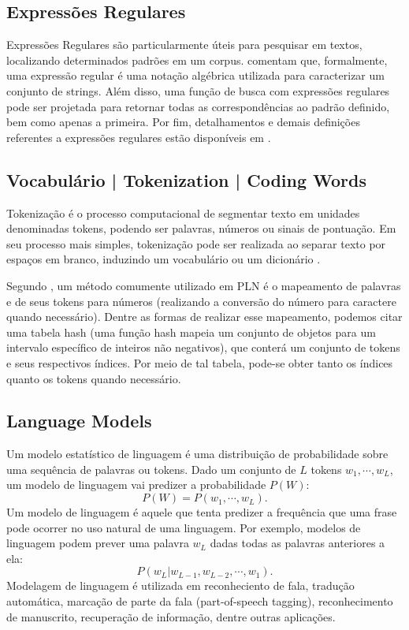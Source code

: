 \documentclass{automatextcc}
\begin{document}
\subsection{Expressões Regulares}
Expressões Regulares são particularmente úteis para pesquisar em textos, localizando determinados padrões em um corpus. \citet{jurafsky2021} comentam que, formalmente, uma expressão regular é uma notação algébrica utilizada para caracterizar um conjunto de strings. Além disso, uma função de busca com expressões regulares pode ser projetada para retornar todas as correspondências ao padrão definido, bem como apenas a primeira. Por fim, detalhamentos e demais definições referentes a expressões regulares estão disponíveis em \citet{jurafsky2021}.


\subsection{Vocabulário | Tokenization | Coding Words}
Tokenização é o processo computacional de segmentar texto em unidades denominadas tokens, podendo ser palavras, números ou sinais de pontuação. Em seu processo mais simples, tokenização pode ser realizada ao separar texto por espaços em branco, induzindo um vocabulário ou um dicionário \citep{kamath2019, jurafsky2021}.

Segundo \citet{manning1999}, um método comumente utilizado em PLN é o mapeamento de palavras e de seus tokens para números (realizando a conversão do número para caractere quando necessário). Dentre as formas de realizar esse mapeamento, podemos citar uma tabela hash (uma função hash mapeia um conjunto de objetos para um intervalo específico de inteiros não negativos), que conterá um conjunto de tokens e seus respectivos índices. Por meio de tal tabela, pode-se obter tanto os índices quanto os tokens quando necessário.


\subsection{Language Models}
Um modelo estatístico de linguagem é uma distribuição de probabilidade sobre uma sequência de palavras ou tokens. Dado um conjunto de $L$ tokens $w_1,\cdots,w_L$, um modelo de linguagem vai predizer a probabilidade $P(W)$:
\begin{equation*}
    P(W) = P(w_1,\cdots,w_L).
\end{equation*}
Um modelo de linguagem é aquele que tenta predizer a frequência que uma frase pode ocorrer no uso natural de uma linguagem. Por exemplo, modelos de linguagem podem prever uma palavra $w_L$ dadas todas as palavras anteriores a ela:
\begin{equation}
    P(w_L | w_{L-1},w_{L-2},\cdots,w_1).
\end{equation}
Modelagem de linguagem é utilizada em reconheciento de fala, tradução automática, marcação de parte da fala (part-of-speech tagging), reconhecimento de manuscrito, recuperação de informação, dentre outras aplicações. 
\citep{kamath2019, jurafsky2021}
\end{document}
